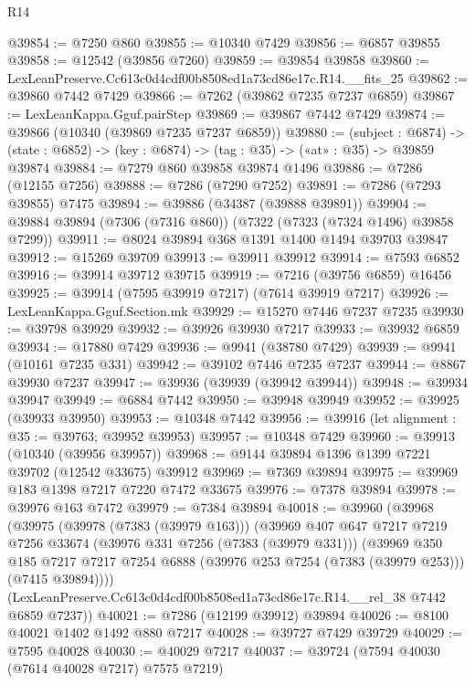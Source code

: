 \begin{lexlean}{R14}
\begin{coremodule}
@39854 := @7250 @860
@39855 := @10340 @7429
@39856 := @6857 @39855
@39858 := @12542 (@39856 @7260)
@39859 := @39854 @39858
@39860 := LexLeanPreserve.Cc613c0d4cdf00b8508ed1a73cd86e17c.R14.__fits_25
@39862 := @39860 @7442 @7429
@39866 := @7262 (@39862 @7235 @7237 @6859)
@39867 := LexLeanKappa.Gguf.pairStep
@39869 := @39867 @7442 @7429
@39874 := @39866 (@10340 (@39869 @7235 @7237 @6859))
@39880 := (subject : @6874) ->
  (state : @6852) -> (key : @6874) -> (tag : @35) -> («at» : @35) -> @39859 @39874
@39884 := @7279 @860 @39858 @39874 @1496
@39886 := @7286 (@12155 @7256)
@39888 := @7286 (@7290 @7252)
@39891 := @7286 (@7293 @39855) @7475
@39894 := @39886 (@34387 (@39888 @39891))
@39904 := @39884 @39894 (@7306 (@7316 @860)) (@7322 (@7323 (@7324 @1496) @39858 @7299))
@39911 := @8024 @39894 @368 @1391 @1400 @1494 @39703 @39847
@39912 := @15269 @39709
@39913 := @39911 @39912
@39914 := @7593 @6852
@39916 := @39914 @39712 @39715
@39919 := @7216 (@39756 @6859) @16456
@39925 := @39914 (@7595 @39919 @7217) (@7614 @39919 @7217)
@39926 := LexLeanKappa.Gguf.Section.mk
@39929 := @15270 @7446 @7237 @7235
@39930 := @39798 @39929
@39932 := @39926 @39930 @7217
@39933 := @39932 @6859
@39934 := @17880 @7429
@39936 := @9941 (@38780 @7429)
@39939 := @9941 (@10161 @7235 @331)
@39942 := @39102 @7446 @7235 @7237
@39944 := @8867 @39930 @7237
@39947 := @39936 (@39939 (@39942 @39944))
@39948 := @39934 @39947
@39949 := @6884 @7442
@39950 := @39948 @39949
@39952 := @39925 (@39933 @39950)
@39953 := @10348 @7442
@39956 := @39916 (let alignment : @35 := @39763; @39952 @39953)
@39957 := @10348 @7429
@39960 := @39913 (@10340 (@39956 @39957))
@39968 := @9144 @39894 @1396 @1399 @7221 @39702 (@12542 @33675) @39912
@39969 := @7369 @39894
@39975 := @39969 @183 @1398 @7217 @7220 @7472 @33675
@39976 := @7378 @39894
@39978 := @39976 @163 @7472
@39979 := @7384 @39894
@40018 := @39960
    (@39968
      (@39975
        (@39978 (@7383 (@39979 @163)))
        (@39969
          @407
          @647
          @7217
          @7219
          @7256
          @33674
          (@39976 @331 @7256 (@7383 (@39979 @331)))
          (@39969
            @350
            @185
            @7217
            @7217
            @7254
            @6888
            (@39976 @253 @7254 (@7383 (@39979 @253)))
            (@7415 @39894))))
      (LexLeanPreserve.Cc613c0d4cdf00b8508ed1a73cd86e17c.R14.__rel_38 @7442 @6859 @7237))
@40021 := @7286 (@12199 @39912) @39894
@40026 := @8100 @40021 @1402 @1492 @880 @7217
@40028 := @39727 @7429 @39729
@40029 := @7595 @40028
@40030 := @40029 @7217
@40037 := @39724 (@7594 @40030 (@7614 @40028 @7217) @7575 @7219)

\end{coremodule}
\end{lexlean}
